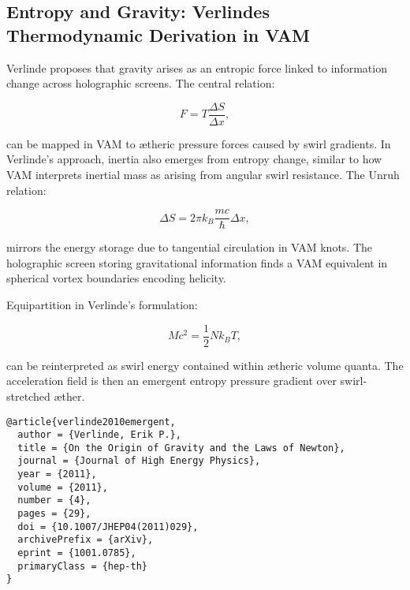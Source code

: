 
\subsection{Entropy and Gravity: Verlinde\rqs s Thermodynamic Derivation in VAM}

Verlinde \cite{verlinde2010emergent} proposes that gravity arises as an entropic force linked to information change across holographic screens. The central relation:

\begin{equation}
F = T \frac{\Delta S}{\Delta x},
\end{equation}

can be mapped in VAM to ætheric pressure forces caused by swirl gradients. In Verlinde's approach, inertia also emerges from entropy change, similar to how VAM interprets inertial mass as arising from angular swirl resistance. The Unruh relation:

\begin{equation}
\Delta S = 2\pi k_B \frac{mc}{\hbar} \Delta x,
\end{equation}

mirrors the energy storage due to tangential circulation in VAM knots. The holographic screen storing gravitational information finds a VAM equivalent in spherical vortex boundaries encoding helicity.

Equipartition in Verlinde's formulation:

\begin{equation}
M c^2 = \frac{1}{2} N k_B T,
\end{equation}

can be reinterpreted as swirl energy contained within ætheric volume quanta. The acceleration field is then an emergent entropy pressure gradient over swirl-stretched æther.

\begin{verbatim}
@article{verlinde2010emergent,
  author = {Verlinde, Erik P.},
  title = {On the Origin of Gravity and the Laws of Newton},
  journal = {Journal of High Energy Physics},
  year = {2011},
  volume = {2011},
  number = {4},
  pages = {29},
  doi = {10.1007/JHEP04(2011)029},
  archivePrefix = {arXiv},
  eprint = {1001.0785},
  primaryClass = {hep-th}
}
\end{verbatim}

